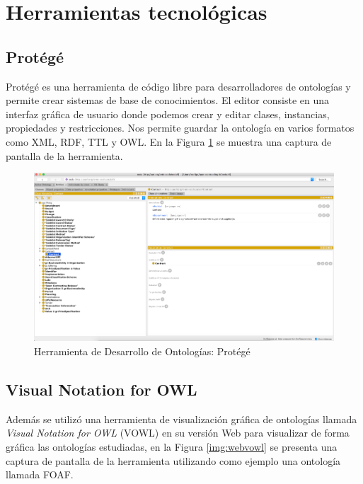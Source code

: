 \section{Herramientas tecnológicas}
\subsection{Protégé}
Protégé es una herramienta de código libre para desarrolladores de ontologías y permite crear sistemas de base de conocimientos. El editor consiste en una interfaz gráfica de usuario donde podemos crear y editar clases, instancias, propiedades y restricciones. Nos permite guardar la ontología en varios formatos como XML, RDF, TTL y OWL. En la Figura \ref{img:protege} se muestra una captura de pantalla de la herramienta.

\begin{figure}[h!]
    \centering
    \includegraphics[width=150mm]{figuras/protege}
    \caption{Herramienta de Desarrollo de Ontologías: Protégé}
    \label{img:protege}
    \end{figure}

\subsection{Visual Notation for OWL}
Además se utilizó una herramienta de visualización gráfica de ontologías llamada \textit{Visual Notation for OWL} (VOWL) en su versión Web para visualizar de forma gráfica las ontologías estudiadas, en la Figura \ref{img:webvowl} se presenta una captura de pantalla de la herramienta utilizando como ejemplo una ontología llamada FOAF.

